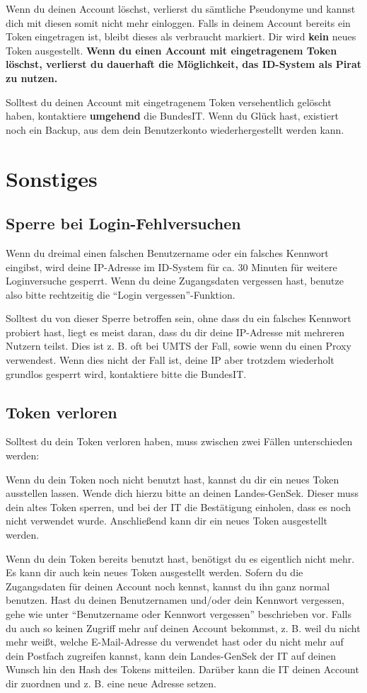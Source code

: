 Wenn du deinen Account löschst, verlierst du sämtliche Pseudonyme und kannst dich mit diesen somit nicht mehr einloggen.
Falls in deinem Account bereits ein Token eingetragen ist, bleibt dieses als verbraucht markiert.
Dir wird \textbf{kein} neues Token ausgestellt.
\textbf{Wenn du einen Account mit eingetragenem Token löschst, verlierst du dauerhaft die Möglichkeit, das ID-System als Pirat zu nutzen.}

Solltest du deinen Account mit eingetragenem Token versehentlich gelöscht haben, kontaktiere \textbf{umgehend} die BundesIT.
Wenn du Glück hast, existiert noch ein Backup, aus dem dein Benutzerkonto wiederhergestellt werden kann.


\newpage
\section{Sonstiges}
\subsection{Sperre bei Login-Fehlversuchen}
Wenn du dreimal einen falschen Benutzername oder ein falsches Kennwort eingibst,
wird deine IP-Adresse im ID-System für ca. 30 Minuten für weitere Loginversuche gesperrt.
Wenn du deine Zugangsdaten vergessen hast, benutze also bitte rechtzeitig die "`Login vergessen"'-Funktion.

Solltest du von dieser Sperre betroffen sein, ohne dass du ein falsches Kennwort probiert hast,
liegt es meist daran, dass du dir deine IP-Adresse mit mehreren Nutzern teilst.
Dies ist z. B. oft bei UMTS der Fall, sowie wenn du einen Proxy verwendest.
Wenn dies nicht der Fall ist, deine IP aber trotzdem wiederholt grundlos gesperrt wird,
kontaktiere bitte die BundesIT.

\subsection{Token verloren}
Solltest du dein Token verloren haben, muss zwischen zwei Fällen unterschieden werden:

Wenn du dein Token noch nicht benutzt hast, kannst du dir ein neues Token ausstellen lassen.
Wende dich hierzu bitte an deinen Landes-GenSek. Dieser muss dein altes Token sperren,
und bei der IT die Bestätigung einholen, dass es noch nicht verwendet wurde.
Anschließend kann dir ein neues Token ausgestellt werden.

Wenn du dein Token bereits benutzt hast, benötigst du es eigentlich nicht mehr.
Es kann dir auch kein neues Token ausgestellt werden.
Sofern du die Zugangsdaten für deinen Account noch kennst, kannst du ihn ganz normal benutzen.
Hast du deinen Benutzernamen und/oder dein Kennwort vergessen, gehe wie unter "`Benutzername oder Kennwort vergessen"' beschrieben vor.
Falls du auch so keinen Zugriff mehr auf deinen Account bekommst,
z. B. weil du nicht mehr weißt, welche E-Mail-Adresse du verwendet hast oder du nicht mehr auf dein Postfach zugreifen kannst,
kann dein Landes-GenSek der IT auf deinen Wunsch hin den Hash des Tokens mitteilen.
Darüber kann die IT deinen Account dir zuordnen und z. B. eine neue Adresse setzen.

